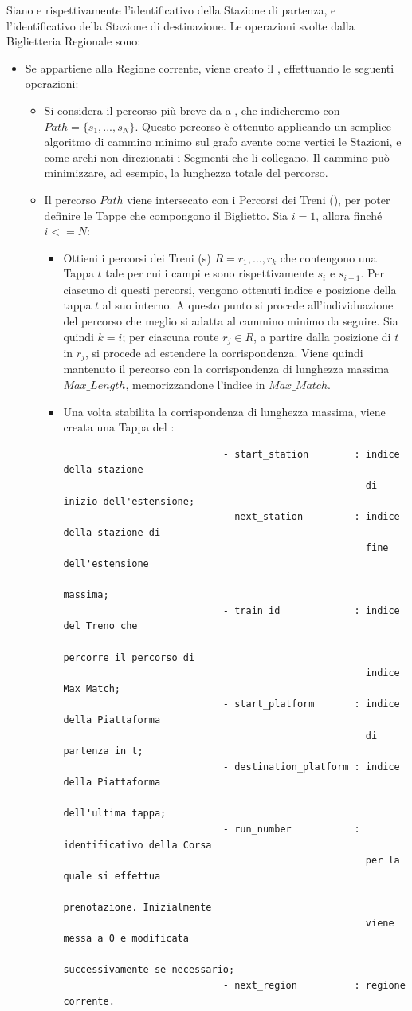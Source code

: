 	Siano  e  rispettivamente l'identificativo della Stazione di partenza, e l'identificativo della Stazione di destinazione. Le operazioni svolte dalla Biglietteria Regionale sono:
	\begin{itemize}
		\item Se  appartiene alla Regione corrente, viene creato il , effettuando le seguenti operazioni:
			\begin {itemize}
					
				\item Si considera il percorso più breve da  a , che indicheremo con $Path = \{s_1,...,s_N\}$. Questo percorso è ottenuto applicando un semplice algoritmo di cammino minimo sul grafo avente come vertici le Stazioni, e come archi non direzionati i Segmenti che li collegano. Il cammino può minimizzare, ad esempio, la lunghezza totale del percorso.
				
				\item Il percorso $Path$ viene intersecato con i Percorsi dei Treni (), per poter definire le Tappe che compongono il Biglietto. Sia $i=1$, allora finché $i<=N$:
					\begin{itemize}
						\item Ottieni i percorsi dei Treni (s) $R={r_1,...,r_k}$ che contengono una Tappa $t$ tale per cui i campi  e  sono rispettivamente $s_i$ e $s_{i+1}$. Per ciascuno di questi percorsi, vengono ottenuti indice e posizione della tappa $t$ al suo interno.
						A questo punto si procede all'individuazione del percorso che meglio si adatta al cammino minimo da seguire. Sia quindi $k = i$; per ciascuna route $r_j \in R$, a partire dalla posizione di $t$ in $r_j$, si procede ad estendere la corrispondenza. Viene quindi mantenuto il percorso con la corrispondenza di lunghezza massima $Max\_Length$, memorizzandone l'indice in $Max\_Match$.
						\item Una volta stabilita la corrispondenza di lunghezza massima, viene creata una Tappa del :
						\begin{verbatim}
							- start_station        : indice della stazione 
							                         di inizio dell'estensione;
							- next_station         : indice della stazione di
							                         fine dell'estensione 
							                         massima;
							- train_id             : indice del Treno che 
							                         percorre il percorso di 
							                         indice Max_Match;
							- start_platform       : indice della Piattaforma
							                         di partenza in t;
							- destination_platform : indice della Piattaforma 
							                         dell'ultima tappa;
							- run_number           : identificativo della Corsa 
							                         per la quale si effettua 
							                         prenotazione. Inizialmente 
							                         viene messa a 0 e modificata 
							                         successivamente se necessario; 
							- next_region          : regione corrente.
							

\end{verbatim}
\end{itemize}
\end{itemize}
\end{itemize}
